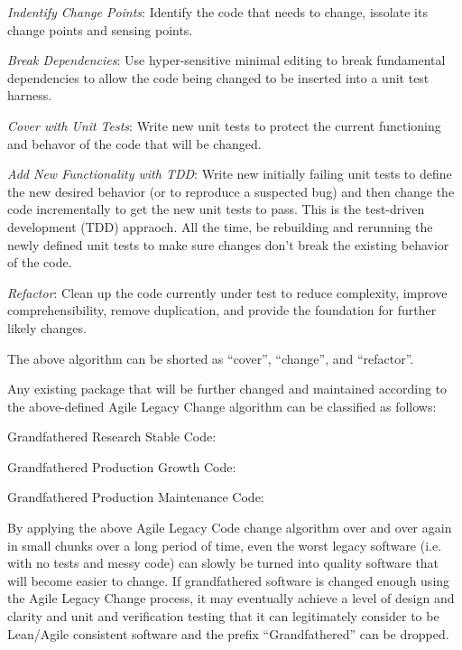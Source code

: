 \documentclass[11pt]{SANDreport}
\begin{document}
\begin{compactenum}

{}\item\textit{Indentify Change Points}: Identify the code that needs
to change, issolate its change points and sensing points.

{}\item\textit{Break Dependencies}: Use hyper-sensitive minimal
editing to break fundamental dependencies to allow the code being
changed to be inserted into a unit test harness.

{}\item\textit{Cover with Unit Tests}: Write new unit tests to protect
the current functioning and behavor of the code that will be changed.

{}\item\textit{Add New Functionality with TDD}: Write new initially
failing unit tests to define the new desired behavior (or to reproduce
a suspected bug) and then change the code incrementally to get the new
unit tests to pass.  This is the test-driven development (TDD)
appraoch.  All the time, be rebuilding and rerunning the newly defined
unit tests to make sure changes don't break the existing behavior of
the code.

{}\item\textit{Refactor}: Clean up the code currently under test to
reduce complexity, improve comprehensibility, remove duplication, and
provide the foundation for further likely changes.

\end{compactenum}

The above algorithm can be shorted as ``cover'', ``change'', and
``refactor''.

Any existing package that will be further changed and maintained
according to the above-defined Agile Legacy Change algorithm can be
classified as follows:

\begin{compactenum}

{}\item Grandfathered Research Stable Code:

{}\item Grandfathered Production Growth Code:

{}\item Grandfathered Production Maintenance Code:

\end{compactenum}

By applying the above Agile Legacy Code change algorithm over and over
again in small chunks over a long period of time, even the worst
legacy software (i.e. with no tests and messy code) can slowly be
turned into quality software that will become easier to change.  If
grandfathered software is changed enough using the Agile Legacy Change
process, it may eventually achieve a level of design and clarity and
unit and verification testing that it can legitimately consider to be
Lean/Agile consistent software and the prefix ``Grandfathered'' can be
dropped.
\end{document}

